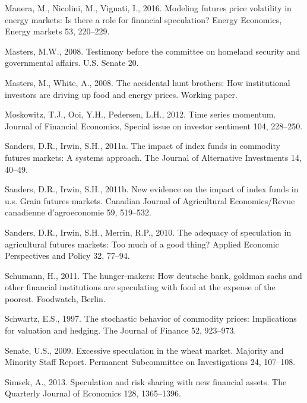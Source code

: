 \documentclass[]{elsarticle} %
\begin{document}
\leavevmode\hypertarget{ref-manera_modeling_2016}{}%
Manera, M., Nicolini, M., Vignati, I., 2016. Modeling futures price volatility in energy markets: Is there a role for financial speculation? Energy Economics, Energy markets 53, 220--229.

\leavevmode\hypertarget{ref-masters_testimony_2008}{}%
Masters, M.W., 2008. Testimony before the committee on homeland security and governmental affairs. U.S. Senate 20.

\leavevmode\hypertarget{ref-masters_accidental_2008}{}%
Masters, M., White, A., 2008. The accidental hunt brothers: How institutional investors are driving up food and energy prices. Working paper.

\leavevmode\hypertarget{ref-moskowitz_time_2012}{}%
Moskowitz, T.J., Ooi, Y.H., Pedersen, L.H., 2012. Time series momentum. Journal of Financial Economics, Special issue on investor sentiment 104, 228--250.

\leavevmode\hypertarget{ref-sanders_impact_2011}{}%
Sanders, D.R., Irwin, S.H., 2011a. The impact of index funds in commodity futures markets: A systems approach. The Journal of Alternative Investments 14, 40--49.

\leavevmode\hypertarget{ref-sanders_new_2011}{}%
Sanders, D.R., Irwin, S.H., 2011b. New evidence on the impact of index funds in u.s. Grain futures markets. Canadian Journal of Agricultural Economics/Revue canadienne d'agroeconomie 59, 519--532.

\leavevmode\hypertarget{ref-sanders_adequacy_2010}{}%
Sanders, D.R., Irwin, S.H., Merrin, R.P., 2010. The adequacy of speculation in agricultural futures markets: Too much of a good thing? Applied Economic Perspectives and Policy 32, 77--94.

\leavevmode\hypertarget{ref-schumann_hunger_2011}{}%
Schumann, H., 2011. The hunger-makers: How deutsche bank, goldman sachs and other financial institutions are speculating with food at the expense of the poorest. Foodwatch, Berlin.

\leavevmode\hypertarget{ref-schwartz_stochastic_1997}{}%
Schwartz, E.S., 1997. The stochastic behavior of commodity prices: Implications for valuation and hedging. The Journal of Finance 52, 923--973.

\leavevmode\hypertarget{ref-senate_excessive_2009}{}%
Senate, U.S., 2009. Excessive speculation in the wheat market. Majority and Minority Staff Report. Permanent Subcommittee on Investigations 24, 107--108.

\leavevmode\hypertarget{ref-simsek_speculation_2013}{}%
Simsek, A., 2013. Speculation and risk sharing with new financial assets. The Quarterly Journal of Economics 128, 1365--1396.
\end{document}
